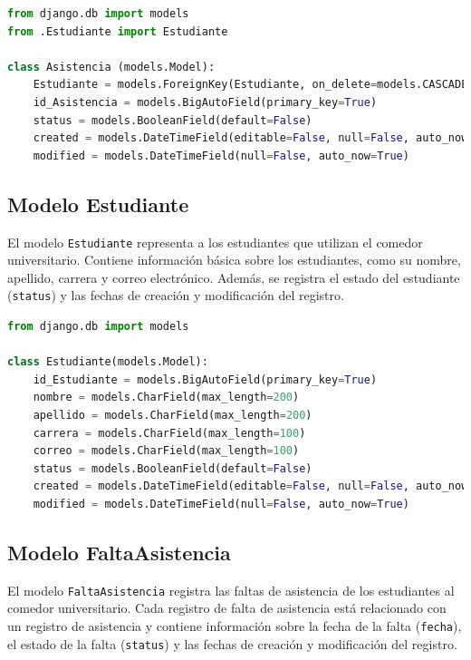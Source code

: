 \documentclass{article}
\begin{document}
\begin{lstlisting}[language=Python, caption={Asistencia}]
from django.db import models
from .Estudiante import Estudiante

class Asistencia (models.Model):
    Estudiante = models.ForeignKey(Estudiante, on_delete=models.CASCADE)
    id_Asistencia = models.BigAutoField(primary_key=True)
    status = models.BooleanField(default=False)
    created = models.DateTimeField(editable=False, null=False, auto_now_add=True)
    modified = models.DateTimeField(null=False, auto_now=True)
\end{lstlisting}

\subsection{Modelo Estudiante}

El modelo \texttt{Estudiante} representa a los estudiantes que utilizan el comedor universitario. Contiene información básica sobre los estudiantes, como su nombre, apellido, carrera y correo electrónico. Además, se registra el estado del estudiante (\texttt{status}) y las fechas de creación y modificación del registro.

\begin{lstlisting}[language=Python, caption={Estudiante}]
from django.db import models

class Estudiante(models.Model):
    id_Estudiante = models.BigAutoField(primary_key=True)
    nombre = models.CharField(max_length=200)
    apellido = models.CharField(max_length=200)
    carrera = models.CharField(max_length=100)
    correo = models.CharField(max_length=100)
    status = models.BooleanField(default=False)
    created = models.DateTimeField(editable=False, null=False, auto_now_add=True)
    modified = models.DateTimeField(null=False, auto_now=True)
\end{lstlisting}

\subsection{Modelo FaltaAsistencia}

El modelo \texttt{FaltaAsistencia} registra las faltas de asistencia de los estudiantes al comedor universitario. Cada registro de falta de asistencia está relacionado con un registro de asistencia y contiene información sobre la fecha de la falta (\texttt{fecha}), el estado de la falta (\texttt{status}) y las fechas de creación y modificación del registro.
\end{document}
